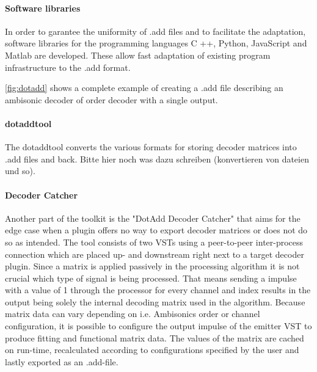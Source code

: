 \documentclass[a4paper, 10pt, twocolumn]{article}
\begin{document}
\paragraph{Software libraries}

In order to garantee the uniformity of .add files and to facilitate the adaptation, software libraries for the programming languages C ++, Python, JavaScript and Matlab are developed. These allow fast adaptation of existing program infrastructure to the .add format.


\ref{fig:dotadd} shows a complete example of creating a .add file describing an ambisonic decoder of order decoder with a  single output.

\paragraph{dotaddtool} 
The dotaddtool converts the various formats for storing decoder matrices into .add files and back. Bitte hier noch was dazu schreiben (konvertieren von dateien und so).


\paragraph{Decoder Catcher}

Another part of the toolkit is the "DotAdd Decoder Catcher" that aims for the edge case when a plugin offers no way to export decoder matrices or does not do so as intended. The tool consists of two VSTs using a peer-to-peer inter-process connection which are placed up- and downstream right next to a target decoder plugin. Since a matrix is applied passively in the processing algorithm it is not crucial which type of signal is being processed. That means sending a impulse with a value of 1 through the processor for every channel and index results in the output being solely the internal decoding matrix used in the algorithm. Because matrix data can vary depending on i.e. Ambisonics order or channel configuration, it is possible to configure the output impulse of the emitter VST to produce fitting and functional matrix data. The values of the matrix are cached on run-time, recalculated according to configurations specified by the user and lastly exported as an .add-file.
\end{document}
